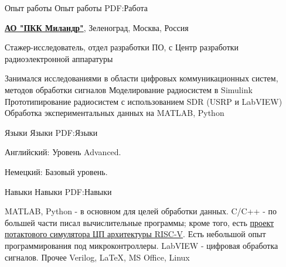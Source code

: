 \documentclass[a4paper, MMyyyy,nonstopmode]{simpleresumecv}
\begin{document}
\begin{Body}









\Section
{Опыт работы}
{Опыт работы}
{PDF:Работа}

\Entry
\href{https://www.milandr.ru/}
{\textbf{АО "ПКК Миландр"}},
Зеленоград, Москва, Россия

\Gap
\BulletItem
Стажер-исследователь,
отдел разработки ПО,
\hfill
с 
\newline
Центр разработки радиоэлектронной аппаратуры
\begin{Detail}
\SubBulletItem
Занимался исследованиями в области цифровых коммуникационных систем, методов обработки сигналов
\SubBulletItem
Моделирование радиосистем в Simulink
\SubBulletItem
Прототипирование радиосистем с использованием SDR (USRP и LabVIEW)
\SubBulletItem
Обработка экспериментальных данных на MATLAB, Python
\end{Detail}


\Section
{Языки}
{Языки}
{PDF:Языки}

\BulletItem
Английский: Уровень Advanced.

\Gap
\BulletItem
Немецкий: Базовый уровень.


\Section
{Навыки}
{Навыки}
{PDF:Навыки}

\BulletItem
MATLAB, Python - в основном для целей обработки данных.
\Gap
\BulletItem
C/C++ - по большей части писал вычислительные программы; кроме того, есть \href{https://github.com/PaulZakharov/riscv-in-nutshell}{проект потактового симулятора ЦП архитектуры RISC-V}. Есть небольшой опыт программирования под микроконтроллеры.
\Gap
\BulletItem
LabVIEW - цифровая обработка сигналов.
\Gap
\BulletItem
Прочее
\SubBulletItem
Verilog,
\SubBulletItem
{\LaTeX},
\SubBulletItem
MS Office,
\SubBulletItem
Linux


\end{Body}
\end{document}
